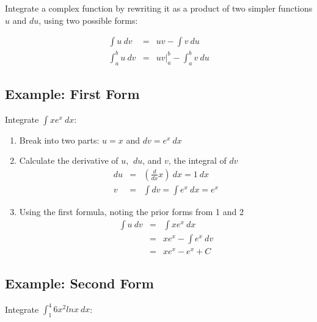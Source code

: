 \hformbar




Integrate a complex function by rewriting it as a product of two simpler functions $u$ and $du$, using two possible forms:

\begin{eqnarray}
  \int u ~dv     &=& uv - \int v ~du \\
  \int_a^b u ~dv &=& uv |_a^b - \int_a^b v ~du
\end{eqnarray}

\subsection{Example: First Form}

Integrate $\int xe^x ~dx$:

\begin{enumerate}
  \item Break into two parts: $u = x$ and $dv = e^x ~dx$
  \item Calculate the derivative of $u$, $~du$, and $v$, the integral of $dv$
	\begin{eqnarray}
	  du &=& \left( \frac{d}{dx} x \right) ~dx = 1 ~dx \\
	  v &=& \int dv = \int e^x ~dx = e^x
	\end{eqnarray}
  \item Using the first formula, noting the prior forms from 1 and 2
	\begin{eqnarray}
      \int u ~dv &=& \int x e^x ~dx \\
	             &=& xe^x - \int e^x ~dv \\
				 &=& xe^x - e^x + C
     \end{eqnarray}
\end{enumerate}

\subsection{Example: Second Form}

Integrate $\int_1^4 6x^2 ln x ~dx$:

